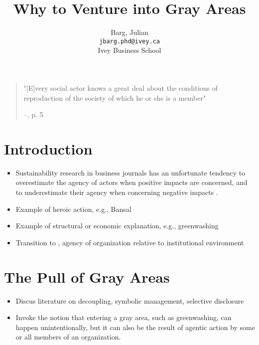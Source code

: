 \documentclass{article}
\title{Why to Venture into Gray Areas}
\author{
	Barg, Julian\\
	\texttt{jbarg.phd@ivey.ca}\\
	Ivey Business School
}
\begin{document}
	\maketitle
	\clearpage

	\begin{quote}
		"[E]very social actor knows a great deal about the conditions of reproduction of the society of which he or she is a member"

		--\citet{Giddens1979}, p. 5
	\end{quote}

	\section*{Introduction}

	\begin{itemize}
		\item Sustainability research in business journals has an unfortunate tendency to overestimate the agency of actors when positive impacts are concerned, and to underestimate their agency when concerning negative impacts \citep[cf.][]{Granovetter1985}.
		\item Example of heroic action, e.g., Bansal
		\item Example of structural or economic explanation, e.g., greenwashing
		\item Transition to \citet{Oliver1991}, agency of organization relative to institutional environment
	\end{itemize}

	\section*{The Pull of Gray Areas}

	\begin{itemize}
		\item Discus literature on decoupling, symbolic management, selective disclosure
		\item Invoke the notion that entering a gray area, such as greenwashing, can happen unintentionally, but it can also be the result of agentic action by some or all members of an organization.
	\end{itemize}
\end{document}
